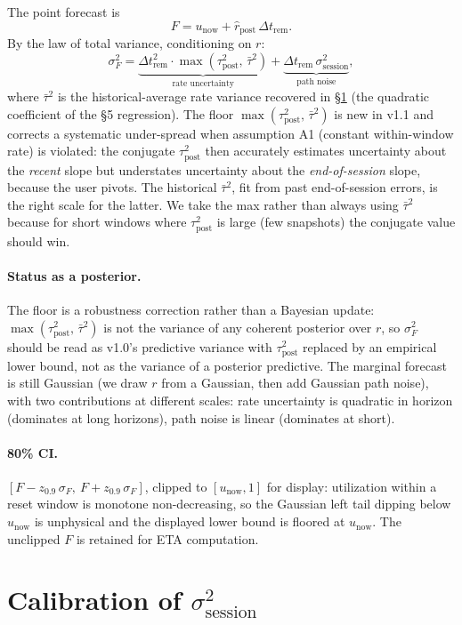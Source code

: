 \documentclass[11pt]{article}
\newcommand{\rpost}{\hat r_{\text{post}}}
\newcommand{\taupostsq}{\tau_{\text{post}}^2}
\newcommand{\sigsessionsq}{\sigma_{\text{session}}^2}
\newcommand{\unow}{u_{\text{now}}}
\newcommand{\Dtrem}{\Delta t_{\text{rem}}}
\begin{document}
The point forecast is
\[
  F = \unow + \rpost\,\Dtrem.
\]
By the law of total variance, conditioning on $r$:
\[
  \sigma_F^2 = \underbrace{\Dtrem^2 \cdot \max(\taupostsq,\, \bar\tau^2)}_{\text{rate uncertainty}}
            + \underbrace{\Dtrem\,\sigsessionsq}_{\text{path noise}},
\]
where $\bar\tau^2$ is the historical-average rate variance recovered in
\S\ref{sec:calib} (the quadratic coefficient of the §5 regression). The floor
$\max(\taupostsq,\, \bar\tau^2)$ is new in v1.1 and corrects a systematic
under-spread when assumption A1 (constant within-window rate) is violated:
the conjugate $\taupostsq$ then accurately estimates uncertainty about the
\emph{recent} slope but understates uncertainty about the
\emph{end-of-session} slope, because the user pivots. The historical $\bar\tau^2$,
fit from past end-of-session errors, is the right scale for the latter. We
take the max rather than always using $\bar\tau^2$ because for short windows
where $\taupostsq$ is large (few snapshots) the conjugate value should win.

\paragraph{Status as a posterior.} The floor is a robustness correction
rather than a Bayesian update: $\max(\taupostsq,\, \bar\tau^2)$ is not the
variance of any coherent posterior over $r$, so $\sigma_F^2$ should be read
as v1.0's predictive variance with $\taupostsq$ replaced by an empirical
lower bound, not as the variance of a posterior predictive. The marginal
forecast is still Gaussian (we draw $r$ from a Gaussian, then add Gaussian
path noise), with two contributions at different scales: rate uncertainty
is quadratic in horizon (dominates at long horizons), path noise is linear
(dominates at short).

\paragraph{80\% CI.} $[F - z_{0.9}\,\sigma_F,\ F + z_{0.9}\,\sigma_F]$,
clipped to $[\unow, 1]$ for display: utilization within a reset window is
monotone non-decreasing, so the Gaussian left tail dipping below $\unow$ is
unphysical and the displayed lower bound is floored at $\unow$. The unclipped
$F$ is retained for ETA computation.

\section{Calibration of $\sigsessionsq$}\label{sec:calib}
\end{document}
